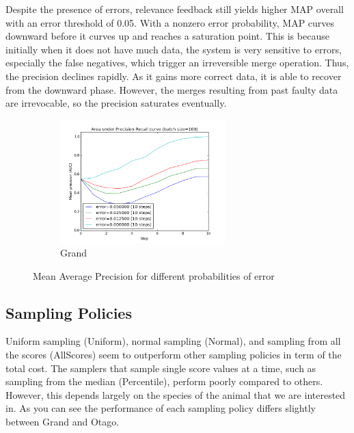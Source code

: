 Despite the presence of errors, relevance feedback still yields higher MAP
overall with an error threshold of 0.05. With a nonzero error probability, MAP
curves downward before it curves up and reaches a saturation point. This is
because initially when it does not have much data, the system is very sensitive
to errors, especially the false negatives, which trigger an irreversible merge
operation. Thus, the precision declines rapidly.  As it gains more correct data,
it is able to recover from the downward phase. However, the merges resulting
from past faulty data are irrevocable, so the precision saturates eventually.

\begin{figure}[htb]
  \centering
  \begin{subfigure}[t]{\textwidth}
      \centering
      \includegraphics[width=0.7\textwidth]{errors/graoc}
      \caption{Grand}
  \end{subfigure}%
  \caption{Mean Average Precision for different probabilities of error}
  \label{fig:errors_aoc} %
\end{figure}

\subsection{Sampling Policies} %
\label{sub:sampling_policies_res}

Uniform sampling (Uniform), normal sampling (Normal), and sampling from all the
scores (AllScores) seem to outperform other sampling policies in term of the
total cost. The samplers that sample single score values at a time, such as
sampling from the median (Percentile), perform poorly compared to others.
However, this depends largely on the species of the animal that we are
interested in. As you can see the performance of each sampling policy differs
slightly between Grand and Otago.

